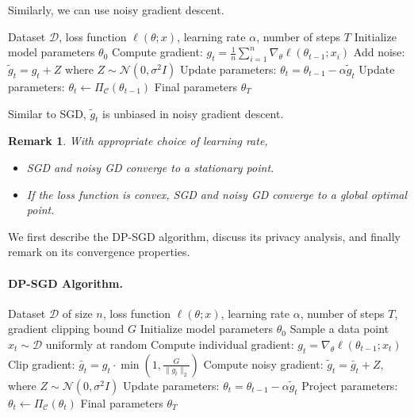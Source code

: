 \documentclass[11pt, a4paper]{article}
\newtheorem{remark}{Remark}
\begin{document}
Similarly, we can use noisy gradient descent.
\begin{algorithm}[H]
\caption{Noisy Gradient Descent (Noisy GD)}
\begin{algorithmic}[1]
\REQUIRE Dataset $\mathcal{D}$, loss function $\ell(\theta; x)$, learning rate $\alpha$, number of steps $T$
\STATE Initialize model parameters $\theta_0$
    \STATE Compute gradient: $g_t = \frac{1}{n} \sum_{i=1}^n \nabla_\theta \ell(\theta_{t-1}; x_i)$
    \STATE Add noise: $\tilde{g}_t = g_t + Z$ where $Z\sim \mathcal{N}(0, \sigma^2 I)$
    \STATE Update parameters: $\theta_t = \theta_{t-1} - \alpha\tilde{g}_t$
    \STATE Update parameters: $\theta_t \leftarrow \Pi_{\mathcal{C}}(\theta_{t-1})$
\ENDFOR
\RETURN Final parameters $\theta_T$
\end{algorithmic}
\end{algorithm}
Similar to SGD, $\tilde{g}_t$ is unbiased in noisy gradient descent.

\begin{remark}
    With appropriate choice of learning rate,
    \begin{itemize}
        \item SGD and noisy GD converge to a stationary point.
        \item If the loss function is convex, SGD and noisy GD converge to a global optimal point.
    \end{itemize}
\end{remark}


We first describe the DP-SGD algorithm, discuss its privacy analysis, and finally remark on its convergence properties.

\paragraph{DP-SGD Algorithm.}
\begin{algorithm}[H]
\caption{Differentially Private Stochastic Gradient Descent (DP-SGD)}
\begin{algorithmic}[1]
\REQUIRE Dataset $\mathcal{D}$ of size $n$, loss function $\ell(\theta; x)$, learning rate $\alpha$, number of steps $T$, gradient clipping bound $G$
\STATE Initialize model parameters $\theta_0$
    \STATE Sample a data point $x_t \sim \mathcal{D}$ uniformly at random
    \STATE Compute individual gradient: $g_t = \nabla_\theta \ell(\theta_{t-1}; x_t)$
    \STATE Clip gradient: $\bar{g}_t = g_t \cdot \min\left(1, \frac{G}{\|g_t\|_2}\right)$
    \STATE Compute noisy gradient: $\tilde{g}_t = \bar{g}_t + Z$, where $Z \sim \mathcal{N}(0, \sigma^2 I)$
    \STATE Update parameters: $\theta_t = \theta_{t-1} - \alpha\tilde{g}_t$
    \STATE Project parameters: $\theta_t \leftarrow \Pi_{\mathcal{C}}(\theta_t)$
\ENDFOR
\RETURN Final parameters $\theta_T$
\end{algorithmic}
\end{algorithm}
\end{document}
